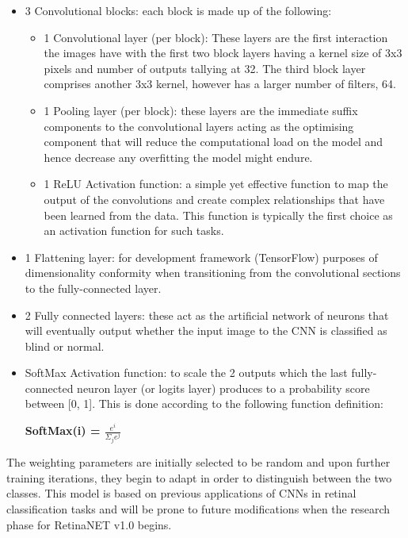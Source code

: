 \documentclass[a4paper]{article}
\begin{document}
            \begin{itemize}
                \item 3 Convolutional blocks: each block is made up of the following:
                    \begin{itemize}
                        \item 1 Convolutional layer (per block): These layers are the first interaction the images have with the first two block layers having a kernel size of 3x3 pixels and number of outputs tallying at 32. The third block layer comprises another 3x3 kernel, however has a larger number of filters, 64. 
                        \item 1 Pooling layer (per block): these layers are the immediate suffix components to the convolutional layers acting as the optimising component that will reduce the computational load on the model and hence decrease any overfitting the model might endure. 
                        \item 1 ReLU Activation function: a simple yet effective function to map the output of the convolutions and create complex relationships that have been learned from the data. This function is typically the first choice as an activation function for such tasks.
                    \end{itemize}
                \item 1 Flattening layer: for development framework (TensorFlow) purposes of dimensionality conformity when transitioning from the convolutional sections to the fully-connected layer.
                \item 2 Fully connected layers: these act as the artificial network of neurons that will eventually output whether the input image to the CNN is classified as blind or normal.
                \item SoftMax Activation function: to scale the 2 outputs which the last fully-connected neuron layer (or logits layer) produces to a probability score between [0, 1]. This is done according to the following function definition:
                \begin{center}
                    \textbf{SoftMax(i) = {\huge $ \frac{e^{i}}{\Sigma_{j} e^{j}}$}}\\
                \end{center}
            \end{itemize}
            The weighting parameters are initially selected to be random and upon further training iterations, they begin to adapt in order to distinguish between the two classes. This model is based on previous applications of CNNs in retinal classification tasks and will be prone to future modifications when the research phase for RetinaNET v1.0 begins.
            \vspace{3mm}
\end{document}
